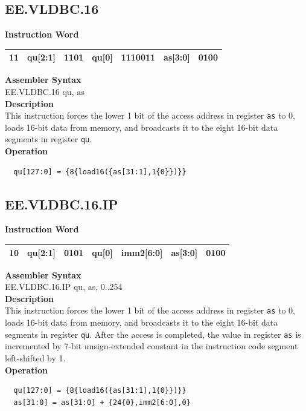 \clearpage
\subsection{EE.VLDBC.16}\label{instruction:EEVLDBC16}
\setlength\tabcolsep{6pt}
\textbf{Instruction Word} \\
\begin{tabular}{|c|c|c|c|c|c|c|}
	\hline
	11 & qu[2:1] & 1101 & qu[0] & 1110011 & as[3:0] & 0100 \\
	\hline
\end{tabular}

\textbf{Assembler Syntax} \\
EE.VLDBC.16 qu, as \\
\textbf{Description} \\
This instruction forces the lower 1 bit of the access address in register \lstinline{as} to 0, loads 16-bit data from memory, and broadcasts it to the eight 16-bit data segments in register \lstinline{qu}.\\
\textbf{Operation}
\begin{lstlisting}
  qu[127:0] = {8{load16({as[31:1],1{0}})}}
\end{lstlisting}

\clearpage
\subsection{EE.VLDBC.16.IP}\label{instruction:EEVLDBC16IP}
\setlength\tabcolsep{6pt}
\textbf{Instruction Word} \\
\begin{tabular}{|c|c|c|c|c|c|c|}
	\hline
	10 & qu[2:1] & 0101 & qu[0] & imm2[6:0] & as[3:0] & 0100 \\
	\hline
\end{tabular}

\textbf{Assembler Syntax} \\
EE.VLDBC.16.IP qu, as, 0..254 \\
\textbf{Description} \\
This instruction forces the lower 1 bit of the access address in register \lstinline{as} to 0, loads 16-bit data from memory, and broadcasts it to the eight 16-bit data segments in register \lstinline{qu}. After the access is completed, the value in register \lstinline{as} is incremented by 7-bit unsign-extended constant in the instruction code segment left-shifted by 1.\\
\textbf{Operation}
\begin{lstlisting}
  qu[127:0] = {8{load16({as[31:1],1{0}})}}
  as[31:0] = as[31:0] + {24{0},imm2[6:0],0}
\end{lstlisting}

